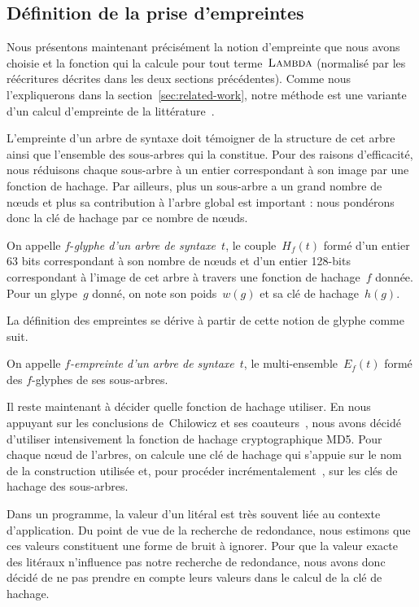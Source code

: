 
\subsection{Définition de la prise d'empreintes}
\label{sec:fingerprint}

Nous présentons maintenant précisément la notion d'empreinte que nous
avons choisie et la fonction qui la calcule pour tout
terme~$\textsc{Lambda}$ (normalisé par les réécritures décrites dans les
deux sections précédentes). Comme nous l'expliquerons dans la
section~\ref{sec:related-work}, notre méthode est une variante d'un
calcul d'empreinte de la littérature~\cite{chilowicz:hal-00627811}.

L'empreinte d'un arbre de syntaxe doit témoigner de la structure de
cet arbre ainsi que l'ensemble des sous-arbres qui la constitue. Pour
des raisons d'efficacité, nous réduisons chaque sous-arbre à un entier
correspondant à son image par une fonction de hachage. Par ailleurs,
plus un sous-arbre a un grand nombre de n{\oe}uds et plus sa
contribution à l'arbre global est important : nous pondérons donc
la clé de hachage par ce nombre de n{\oe}uds.

\begin{defn}
On appelle $f$-\textit{glyphe d'un arbre de syntaxe}~$t$, le
couple~$H_f(t)$ formé d'un entier 63 bits correspondant à son nombre
de n{\oe}uds et d'un entier 128-bits correspondant à l'image de cet
arbre à travers une fonction de hachage~$f$ donnée. Pour un glype~$g$
donné, on note son poids~$w(g)$ et sa clé de hachage~$h(g)$.
\end{defn}

La définition des empreintes se dérive à partir de cette notion de glyphe
comme suit.

\begin{defn}
On appelle \textit{$f$-empreinte d'un arbre de syntaxe}~$t$, le
multi-ensemble~$E_f(t)$ formé des $f$-glyphes de ses sous-arbres.
\end{defn}

Il reste maintenant à décider quelle fonction de hachage utiliser.  En
nous appuyant sur les conclusions de~Chilowicz et ses
coauteurs~\cite{chilowicz:hal-00627811}, nous avons décidé d'utiliser
intensivement la fonction de hachage cryptographique MD5. Pour chaque
n{\oe}ud de l'arbres, on calcule une clé de hachage qui s'appuie sur
le nom de la construction utilisée et, pour procéder
incrémentalement~\cite{DBLP:conf/ml/FilliatreC06}, sur les clés de
hachage des sous-arbres.

Dans un programme, la valeur d'un litéral est très souvent liée au
contexte d'application. Du point de vue de la recherche de redondance, nous
estimons que ces valeurs constituent une forme de bruit à ignorer.
Pour que la valeur exacte des litéraux n'influence pas notre recherche
de redondance, nous avons donc décidé de ne pas prendre en compte leurs
valeurs dans le calcul de la clé de hachage.
